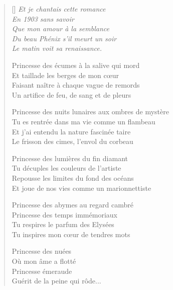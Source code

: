 \settowidth{\versewidth}{Princesse des nuits lunaires aux ombres de mystère}
\begin{verse}[\versewidth]
\emph{\hspace{10em}Et je chantais cette romance \\
\hspace{10em}En 1903 sans savoir \\
\hspace{10em}Que mon amour à la semblance \\
\hspace{10em}Du beau Phénix s'il meurt un soir \\
\hspace{10em}Le matin voit sa renaissance. \\}

Princesse des écumes à la salive qui mord \\
Et taillade les berges de mon cœur \\
Faisant naître à chaque vague de remords \\
Un artifice de feu, de sang et de pleurs

Princesse des nuits lunaires aux ombres de mystère \\
Tu es rentrée dans ma vie comme un flambeau \\
Et j'ai entendu la nature fascinée taire \\
Le frisson des cimes, l'envol du corbeau

Princesse des lumières du fin diamant \\
Tu décuples les couleurs de l'artiste \\
Repousse les limites du fond des océans \\
Et joue de nos vies comme un marionnettiste

Princesse des abymes au regard cambré \\
Princesse des temps immémoriaux \\
Tu respires le parfum des Elysées \\
Tu inspires mon cœur de tendres mots

Princesse des nuées \\
Où mon âme a flotté \\
Princesse émeraude \\
Guérit de la peine qui rôde...
\end{verse}